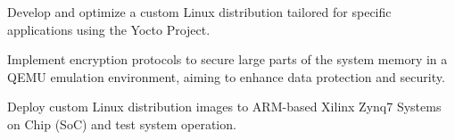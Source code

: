 \begin{tightemize}
    \item Develop and optimize a custom Linux distribution tailored for specific applications using the Yocto Project.
    \item Implement encryption protocols to secure large parts of the system memory in a QEMU emulation environment, aiming to enhance data protection and security.
    \item Deploy custom Linux distribution images to ARM-based Xilinx Zynq7 Systems on Chip (SoC) and test system operation.
\end{tightemize}